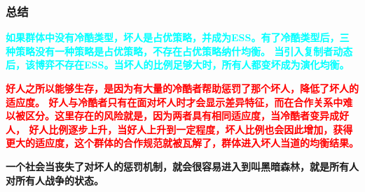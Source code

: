 \documentclass[12pt, a4paper]{article} %
\begin{document}
\begin{CJK*}{UTF8}{gbsn}
         \subsubsection{总结}
         \textbf{\textcolor{cyan}{如果群体中没有冷酷类型，坏人是占优策略，并成为ESS。有了冷酷类型后，三种策略没有一种策略是占优策略，不存在占优策略纳什均衡。
         当引入复制者动态后，该博弈不存在ESS。当坏人的比例足够大时，所有人都变坏成为演化均衡。}} \par

         \textbf{\textcolor{red}{好人之所以能够生存，是因为有大量的冷酷者帮助惩罚了那个坏人，降低了坏人的适应度。
         好人与冷酷者只有在面对坏人时才会显示差异特征，而在合作关系中难以被区分。这里存在的风险就是，因为两者具有相同适应度，当冷酷者变异成好人，
         好人比例逐步上升，当好人上升到一定程度，坏人比例也会因此增加，获得更大的适应度，这个群体的合作规范就被瓦解了，群体进入坏人当道的均衡结果。}} \par

         \textbf{一个社会当丧失了对坏人的惩罚机制，就会很容易进入到叫黑暗森林，就是所有人对所有人战争的状态。}

















    \end{CJK*}
\end{document}
